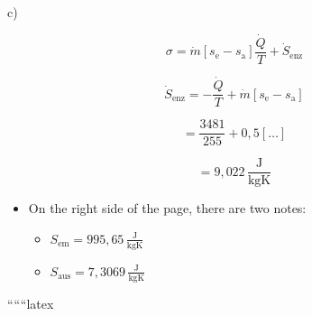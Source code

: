 c)

\[
\sigma = \dot{m} \left[ s_{\text{e}} - s_{\text{a}} \right] \frac{\dot{Q}}{T} + \dot{S}_{\text{enz}}
\]

\[
\dot{S}_{\text{enz}} = - \frac{\dot{Q}}{T} + \dot{m} \left[ s_{\text{e}} - s_{\text{a}} \right]
\]

\[
= \frac{3481}{255} + 0,5 \left[ \ldots \right]
\]

\[
= 9,022 \, \frac{\text{J}}{\text{kgK}}
\]

\begin{itemize}
    \item On the right side of the page, there are two notes:
    \begin{itemize}
        \item $S_{\text{em}} = 995,65 \, \frac{\text{J}}{\text{kgK}}$
        \item $S_{\text{aus}} = 7,3069 \, \frac{\text{J}}{\text{kgK}}$
    \end{itemize}
\end{itemize}

``````latex
